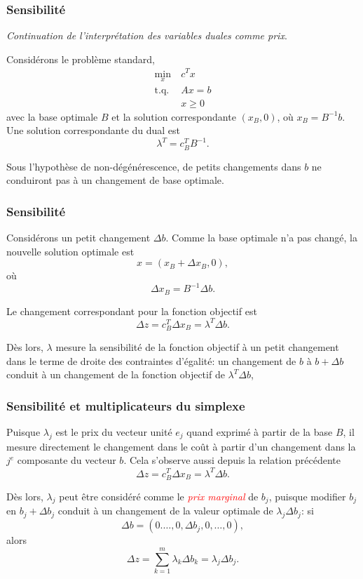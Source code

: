 \documentclass[usepdftitle=false]{beamer}
\begin{document}

\begin{frame}
	\frametitle{Sensibilité}
	
	{\it Continuation de l'interprétation des variables duales comme prix}.
	
	\mbox{}
	
	Considérons le problème standard,
	\begin{align*}
		\min_x \ & c^T x \\
		\mbox{t.q. } & Ax = b \\
		& x \geq 0
	\end{align*}
	avec la base optimale $B$ et la solution correspondante $(x_B, 0)$, où $x_B = B^{-1}b$. Une solution correspondante du dual est
	\[
	\lambda^T = c_B^T B^{-1}.
	\]
	
	\mbox{}
	
	Sous l'hypothèse de non-dégénérescence, de petits changements dans $b$ ne conduiront pas à un changement de base optimale.
	
\end{frame}

\begin{frame}
	\frametitle{Sensibilité}
	
	Considérons un petit changement $\Delta b$. Comme la base optimale n'a pas changé, la nouvelle solution optimale est
	\[
	x = (x_B + \Delta x_B, 0),
	\]
	où
	\[
	\Delta x_B = B^{-1} \Delta b.
	\]
	
	Le changement correspondant pour la fonction objectif est
	\[
	\Delta z = c_B^T \Delta x_B = \lambda^T \Delta b.
	\]
	
	\mbox{}
	
	Dès lors, $\lambda$ mesure la sensibilité de la fonction objectif à un petit changement dans le terme de droite des contraintes d'égalité: un changement de $b$ à $b+\Delta b$ conduit à un changement de la fonction objectif de $\lambda^T \Delta b$,
	
\end{frame}

\begin{frame}
	\frametitle{Sensibilité et multiplicateurs du simplexe}
	
	Puisque $\lambda_j$ est le prix du vecteur unité $e_j$ quand exprimé à partir de la base $B$, il mesure directement le changement dans le coût à partir d'un changement dans la $j^e$ composante du vecteur $b$. Cela s'observe aussi depuis la relation précédente
	\[
	\Delta z = c_B^T \Delta x_B = \lambda^T \Delta b.
	\]
	
	\mbox{}
	
	Dès lors, $\lambda_j$ peut être considéré comme le \textsl{\textcolor{red}{prix marginal}} de $b_j$, puisque modifier $b_j$ en $b_j + \Delta b_j$ conduit à un changement de la valeur optimale de $\lambda_j \Delta b_j$: si
	\[
	\Delta b = (0.\ldots,0,\Delta b_j,0,\ldots,0),
	\]
	alors
	\[
	\Delta z = \sum_{k=1}^m \lambda_k \Delta b_k = \lambda_j \Delta b_j.
	\]
	
\end{frame}
\end{document}
